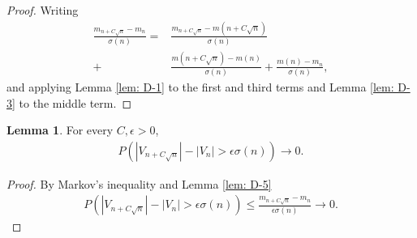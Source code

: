 \documentclass[12pt]{article}
\theoremstyle{definition}
\newtheorem{lemma}[proposition]{Lemma}
\begin{document}
\begin{proof} Writing
    \begin{align*}
        \frac{m_{n+C\sqrt{n}}-m_n}{\sigma(n)}=&\frac{m_{n+C\sqrt{n}}-m(n+C\sqrt{n})}{\sigma(n)} \\
        +&\frac{m(n+C\sqrt{n})-m(n)}{\sigma(n)}+\frac{m(n)-m_n}{\sigma(n)},
    \end{align*} and applying Lemma \ref{lem: D-1} to the first and third terms and Lemma \ref{lem: D-3} to the middle term.
\end{proof}
\begin{lemma} \label{lem: D-6}
    For every $C,\epsilon > 0$,
    \begin{align*}
        P(|V_{n+C\sqrt{n}}|-|V_n| > \epsilon \sigma(n)) \rightarrow 0.
    \end{align*}
\end{lemma}
\begin{proof}By Markov's inequality and Lemma \ref{lem: D-5}
\begin{align*}
P(|V_{n+C\sqrt{n}}|-|V_n| > \epsilon \sigma(n)) \leq \frac{m_{n+C\sqrt{n}}-m_n}{\epsilon \sigma(n)} \rightarrow 0.
\end{align*}
\end{proof}
\end{document}
